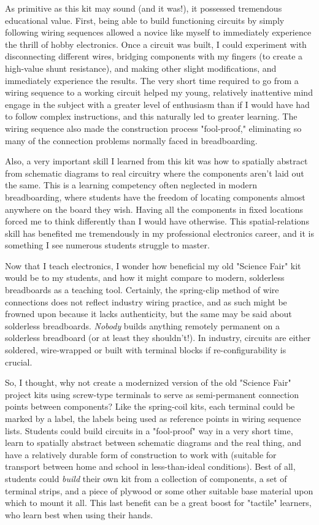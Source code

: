 \vskip 10pt

As primitive as this kit may sound (and it was!), it possessed tremendous educational value.  First, being able to build functioning circuits by simply following wiring sequences allowed a novice like myself to immediately experience the thrill of hobby electronics.  Once a circuit was built, I could experiment with disconnecting different wires, bridging components with my fingers (to create a high-value shunt resistance), and making other slight modifications, and immediately experience the results.  The very short time required to go from a wiring sequence to a working circuit helped my young, relatively inattentive mind engage in the subject with a greater level of enthusiasm than if I would have had to follow complex instructions, and this naturally led to greater learning.  The wiring sequence also made the construction process "fool-proof," eliminating so many of the connection problems normally faced in breadboarding.

Also, a very important skill I learned from this kit was how to spatially abstract from schematic diagrams to real circuitry where the components aren't laid out the same.  This is a learning competency often neglected in modern breadboarding, where students have the freedom of locating components almost anywhere on the board they wish.  Having all the components in fixed locations forced me to think differently than I would have otherwise.  This spatial-relations skill has benefited me tremendously in my professional electronics career, and it is something I see numerous students struggle to master.

\vskip 10pt

Now that I teach electronics, I wonder how beneficial my old "Science Fair" kit would be to my students, and how it might compare to modern, solderless breadboards as a teaching tool.  Certainly, the spring-clip method of wire connections does not reflect industry wiring practice, and as such might be frowned upon because it lacks authenticity, but the same may be said about solderless breadboards.  {\it Nobody} builds anything remotely permanent on a solderless breadboard (or at least they shouldn't!).  In industry, circuits are either soldered, wire-wrapped or built with terminal blocks if re-configurability is crucial.

So, I thought, why not create a modernized version of the old "Science Fair" project kits using screw-type terminals to serve as semi-permanent connection points between components?  Like the spring-coil kits, each terminal could be marked by a label, the labels being used as reference points in wiring sequence lists.  Students could build circuits in a "fool-proof" way in a very short time, learn to spatially abstract between schematic diagrams and the real thing, and have a relatively durable form of construction to work with (suitable for transport between home and school in less-than-ideal conditions).  Best of all, students could {\it build} their own kit from a collection of components, a set of terminal strips, and a piece of plywood or some other suitable base material upon which to mount it all.  This last benefit can be a great boost for "tactile" learners, who learn best when using their hands.

